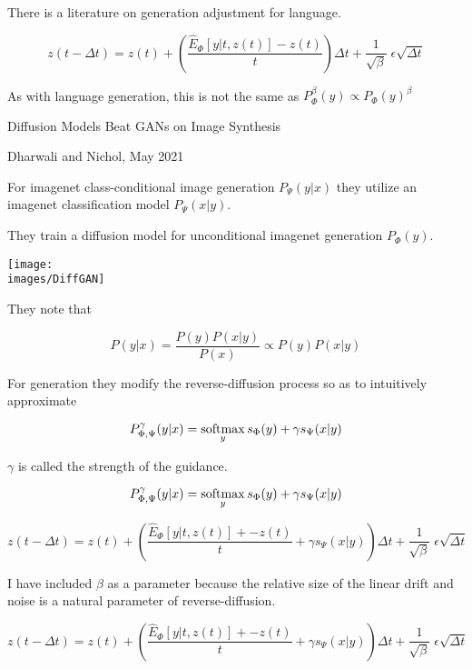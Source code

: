 {\vfill
There is a literature on generation adjustment for language.


{\huge

$$z(t - \Delta t) = z(t) + \left(\frac{\hat{E}_\Phi[y|t,z(t)] - z(t)}{t}\right)\Delta t + \frac{1}{\sqrt{\beta}}\;\epsilon\sqrt{\Delta t}$$

\vfill
As with language generation, this is not the same as $P^\beta_\Phi(y) \propto P_\Phi(y)^\beta$
}


\centerline{Diffusion Models Beat GANs on Image Synthesis}
\centerline{Dharwali and Nichol, May 2021}

\vfill
For imagenet class-conditional image generation $P_\Psi(y|x)$ they utilize an imagenet classification model $P_\Psi(x|y)$.

\vfill
They train a diffusion model for unconditional imagenet generation $P_\Phi(y)$.

\centerline{\texttt{[image: \\images/DiffGAN]}}


They note that

$$P(y|x) = \frac{P(y)P(x|y)}{P(x)} \propto P(y)P(x|y)$$

\vfill
For generation they modify the reverse-diffusion process so as to intuitively approximate

\vfill
$$P^\gamma_{\Phi,\Psi}(y|x) = \operatorname*{softmax}_y s_\Phi(y)+ \gamma s_\Psi(x|y)$$

\vfill
$\gamma$ is called the strength of the guidance.



$$P^\gamma_{\Phi,\Psi}(y|x) = \operatorname*{softmax}_y s_\Phi(y)+ \gamma s_\Psi(x|y)$$

\vfill
{\huge $$z(t - \Delta t) = z(t) + \left(\frac{\hat{E}_\Phi[y|t,z(t)] + - z(t)}{t} + \gamma s_\Psi(x|y)\right)\Delta t + \frac{1}{\sqrt{\beta}}\;\epsilon\sqrt{\Delta t}$$}

\vfill
I have included $\beta$ as a parameter because the relative size of the linear drift and noise is a natural parameter of reverse-diffusion.


{\huge $$z(t - \Delta t) = z(t) + \left(\frac{\hat{E}_\Phi[y|t,z(t)] + - z(t)}{t} + \gamma s_\Psi(x|y)\right)\Delta t + \frac{1}{\sqrt{\beta}}\;\epsilon\sqrt{\Delta t}$$}

}

